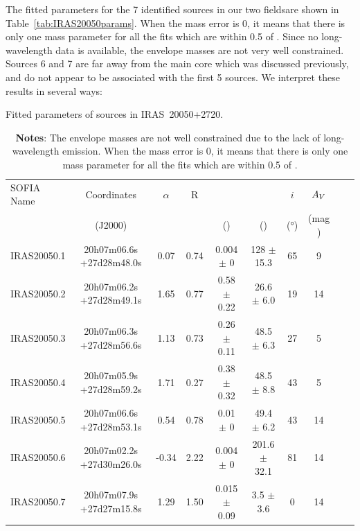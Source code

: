 The fitted parameters for the 7 identified sources in our two fieldsare shown in Table~\ref{tab:IRAS20050params}. When the mass error is 0, it means that there is only one mass parameter for all the fits which are within 0.5 of \Rmin. Since no long-wavelength data is available, the envelope masses are not very well constrained. Sources 6 and 7 are far away from the main core which was discussed previously, and do not appear to be associated with the first 5 sources. We interpret these results in several ways:
\renewcommand{\arraystretch}{1.5}
\begin{table}[!h]
\scriptsize
\caption[Fitted parameters in IRAS~20050+2720]{Fitted parameters of sources in IRAS~20050+2720.}
\label{tab:IRAS20050params}
\vspace{-0.5cm}
\begin{longtable}{lccccccccc}
\toprule																			
SOFIA Name	&	Coordinates	&	$\alpha$	&	R	&	\Menv			&	\Ltot			&	$i$	&	$A_V$	\\
	&	(J2000)	&		&		&	(\si{\Msun})			&	(\si{\Lsun})			&	(\si{\degree})	&	(mag	)\\
\midrule																			
IRAS20050.1	&	20h07m06.6s +27d28m48.0s	&	0.07	&	0.74	&	0.004	$\pm$	0	&	128	$\pm$	15.3	&	65	&	9	\\
IRAS20050.2	&	20h07m06.2s +27d28m49.1s	&	1.65	&	0.77	&	0.58	$\pm$	0.22	&	26.6	$\pm$	6.0	&	19	&	14	\\
IRAS20050.3	&	20h07m06.3s +27d28m56.6s	&	1.13	&	0.73	&	0.26	$\pm$	0.11	&	48.5	$\pm$	6.3	&	27	&	5	\\
IRAS20050.4	&	20h07m05.9s +27d28m59.2s	&	1.71	&	0.27	&	0.38	$\pm$	0.32	&	48.5	$\pm$	8.8	&	43	&	5	\\
IRAS20050.5	&	20h07m06.6s +27d28m53.1s	&	0.54	&	0.78	&	0.01	$\pm$	0	&	49.4	$\pm$	6.2	&	43	&	14	\\
IRAS20050.6	&	20h07m02.2s +27d30m26.0s	&	-0.34	&	2.22	&	0.004	$\pm$	0	&	201.6	$\pm$	32.1	&	81	&	14	\\
IRAS20050.7	&	20h07m07.9s +27d27m15.8s	&	1.29	&	1.50	&	0.015	$\pm$	0.09	&	3.5	$\pm$	3.6	&	0	&	14	\\
\bottomrule	
\end{longtable} 
\caption*{\textbf{Notes}: The envelope masses are not well constrained due to the lack of long-wavelength emission. When the mass error is 0, it means that there is only one mass parameter for all the fits which are within 0.5 of \Rmin.}
\end{table}

